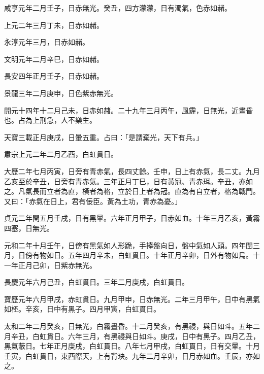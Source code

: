 \begin{pinyinscope}
 咸亨元年二月壬子，日赤無光。癸丑，四方濛濛，日有濁氣，色赤如赭。



 上元二年三月丁未，日赤如赭。



 永淳元年三月，日赤如赭。



 文明元年二月辛巳，日赤如赭。



 長安四年正月壬子，日赤如赭。



 景龍三年二月庚申，日色紫赤無光。



 開元十四年十二月己未，日赤如赭。二十九年三月丙午，風霾，日無光，近晝昏也。占為上刑急，人不樂生。



 天寶三載正月庚戌，日暈五重。占曰：「是謂棄光，天下有兵。」



 肅宗上元二年二月乙酉，白虹貫日。



 大歷二年七月丙寅，日旁有青赤氣，長四丈餘。壬申，日上有赤氣，長二丈。九月乙亥至於辛丑，日旁有青赤氣。三年正月丁巳，日有黃冠、青赤珥。辛丑，亦如之。凡氣長而立者為直，橫者為格，立於日上者為冠。直為有自立者，格為戰鬥。又曰：「赤氣在日上，君有佞臣。黃為土功，青赤為憂。」



 貞元二年閏五月壬戌，日有黑暈。六年正月甲子，日赤如血。十年三月乙亥，黃霧四塞，日無光。



 元和二年十月壬午，日傍有黑氣如人形跪，手捧盤向日，盤中氣如人頭。四年閏三月，日傍有物如日。五年四月辛未，白虹貫日。十年正月辛卯，日外有物如烏。十一年正月己卯，日紫赤無光。



 長慶元年六月己丑，白虹貫日。三年二月庚戌，白虹貫日。



 寶歷元年六月甲戌，赤虹貫日。九月甲申，日赤無光。二年三月甲午，日中有黑氣如柸。辛亥，日中有黑子。四月甲寅，白虹貫日。



 太和二年二月癸亥，日無光，白霧晝昏。十二月癸亥，有黑祲，與日如斗。五年二月辛丑，白虹貫日。六年三月，有黑祲與日如斗。庚戌，日中有黑子。四月乙丑，黑氣蔽日。七年正月庚戌，白虹貫日。八年七月甲戌，白虹貫日，日有交暈。十月壬寅，白虹貫日，東西際天，上有背玦。九年二月辛卯，日月赤如血。壬辰，亦如之。




\end{pinyinscope}
